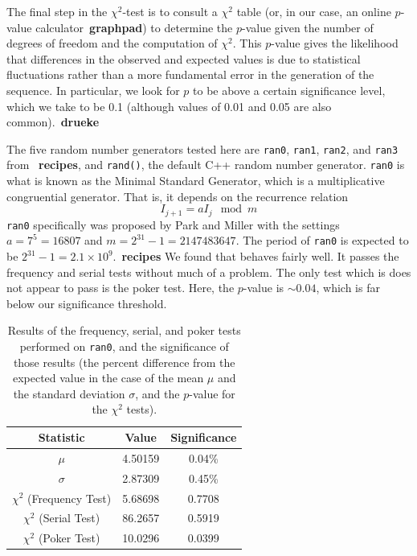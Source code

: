 \documentclass[12pt]{article}
\numberwithin{equation}{section}
\begin{document}
\par The final step in the $\chi^{2}$-test is to consult a $\chi^{2}$ table (or, in our case, an online $p$-value calculator~\textbf{graphpad}) to determine the $p$-value given the number of degrees of freedom and the computation of $\chi^{2}$.  This $p$-value gives the likelihood that differences in the observed and expected values is due to statistical fluctuations rather than a more fundamental error in the generation of the sequence.  In particular, we look for $p$ to be above a certain significance level, which we take to be 0.1 (although values of 0.01 and 0.05 are also common).~\textbf{drueke}
\par The five random number generators tested here are \texttt{ran0}, \texttt{ran1}, \texttt{ran2}, and \texttt{ran3} from ~\textbf{recipes}, and \texttt{rand()}, the default C++ random number generator.  \texttt{ran0} is what is known as the Minimal Standard Generator, which is a multiplicative congruential generator.  That is, it depends on the recurrence relation
\begin{equation}
\label{eq:ran0recur}
I_{j+1}=aI_{j}\mod m
\end{equation}
\texttt{ran0} specifically was proposed by Park and Miller with the settings $a=7^{5}=16807$ and $m=2^{31}-1=2147483647$.  The period of \texttt{ran0} is expected to be $2^{31}-1=2.1\times10^{9}$.~\textbf{recipes}  We found that  behaves fairly well.  It passes the frequency and serial tests without much of a problem.  The only test which is does not appear to pass is the poker test.  Here, the $p$-value is $\sim0.04$, which is far below our significance threshold.  

\begin{table}[ht]
\begin{center}
\begin{tabular}{c|c|c} \hline
Statistic & Value & Significance\\\hline
$\mu$ & 4.50159 & 0.04\% \\
$\sigma$ & 2.87309 & 0.45\%\\
$\chi^{2}$ (Frequency Test) & 5.68698 & 0.7708 \\
$\chi^{2}$ (Serial Test) & 86.2657 & 0.5919 \\
$\chi^{2}$ (Poker Test) & 10.0296 & 0.0399 \\ \hline
\end{tabular}
\caption{Results of the frequency, serial, and poker tests performed on \texttt{ran0}, and the significance of those results (the percent difference from the expected value in the case of the mean $\mu$ and the standard deviation $\sigma$, and the $p$-value for the $\chi^{2}$ tests).}
\label{tab:ran0results}
\end{center}
\end{table}
\end{document}
